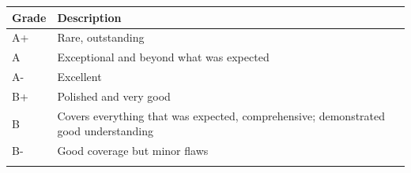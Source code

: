 \documentclass[]{book}
\theoremstyle{definition}
\theoremstyle{definition}
\theoremstyle{definition}
\theoremstyle{remark}
\begin{document}
\begin{longtable}[]{@{}ll@{}}
\toprule
\begin{minipage}[b]{0.08\columnwidth}\raggedright
Grade\strut
\end{minipage} & \begin{minipage}[b]{0.86\columnwidth}\raggedright
Description\strut
\end{minipage}\tabularnewline
\midrule
\endhead
\begin{minipage}[t]{0.08\columnwidth}\raggedright
A+\strut
\end{minipage} & \begin{minipage}[t]{0.86\columnwidth}\raggedright
Rare, outstanding\strut
\end{minipage}\tabularnewline
\begin{minipage}[t]{0.08\columnwidth}\raggedright
A\strut
\end{minipage} & \begin{minipage}[t]{0.86\columnwidth}\raggedright
Exceptional and beyond what was expected\strut
\end{minipage}\tabularnewline
\begin{minipage}[t]{0.08\columnwidth}\raggedright
A-\strut
\end{minipage} & \begin{minipage}[t]{0.86\columnwidth}\raggedright
Excellent\strut
\end{minipage}\tabularnewline
\begin{minipage}[t]{0.08\columnwidth}\raggedright
B+\strut
\end{minipage} & \begin{minipage}[t]{0.86\columnwidth}\raggedright
Polished and very good\strut
\end{minipage}\tabularnewline
\begin{minipage}[t]{0.08\columnwidth}\raggedright
B\strut
\end{minipage} & \begin{minipage}[t]{0.86\columnwidth}\raggedright
Covers everything that was expected, comprehensive; demonstrated good
understanding\strut
\end{minipage}\tabularnewline
\begin{minipage}[t]{0.08\columnwidth}\raggedright
B-\strut
\end{minipage} & \begin{minipage}[t]{0.86\columnwidth}\raggedright
Good coverage but minor flaws\strut
\end{minipage}\tabularnewline
\begin{minipage}[t]{0.08\columnwidth}\raggedright

\end{minipage}
\end{longtable}
\end{document}
